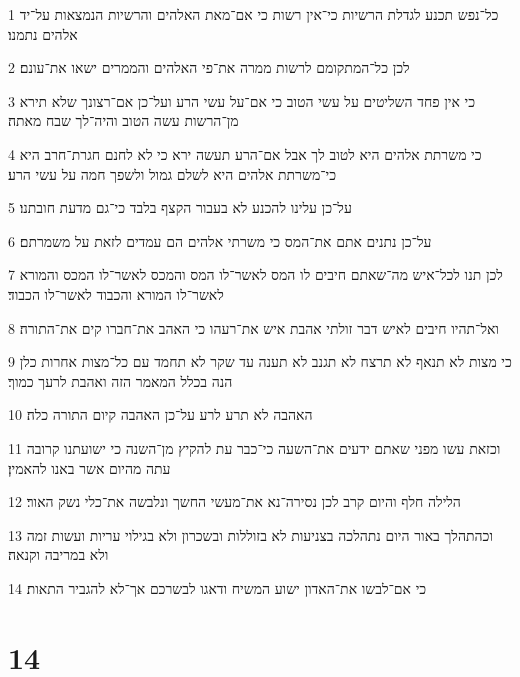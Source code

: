 \par 1 כל־נפש תכנע לגדלת הרשיות כי־אין רשות כי אם־מאת האלהים והרשיות הנמצאות על־יד אלהים נתמנו׃
\par 2 לכן כל־המתקומם לרשות ממרה את־פי האלהים והממרים ישאו את־עונם׃
\par 3 כי אין פחד השליטים על עשי הטוב כי אם־על עשי הרע ועל־כן אם־רצונך שלא תירא מן־הרשות עשה הטוב והיה־לך שבח מאתה׃
\par 4 כי משרתת אלהים היא לטוב לך אבל אם־הרע תעשה ירא כי לא לחנם חגרת־חרב היא כי־משרתת אלהים היא לשלם גמול ולשפך חמה על עשי הרע׃
\par 5 על־כן עלינו להכנע לא בעבור הקצף בלבד כי־גם מדעת חובתנו׃
\par 6 על־כן נתנים אתם את־המס כי משרתי אלהים הם עמדים לזאת על משמרתם׃
\par 7 לכן תנו לכל־איש מה־שאתם חיבים לו המס לאשר־לו המס והמכס לאשר־לו המכס והמורא לאשר־לו המורא והכבוד לאשר־לו הכבוד׃
\par 8 ואל־תהיו חיבים לאיש דבר זולתי אהבת איש את־רעהו כי האהב את־חברו קים את־התורה׃
\par 9 כי מצות לא תנאף לא תרצח לא תגנב לא תענה עד שקר לא תחמד עם כל־מצות אחרות כלן הנה בכלל המאמר הזה ואהבת לרעך כמוך׃
\par 10 האהבה לא תרע לרע על־כן האהבה קיום התורה כלה׃
\par 11 וכזאת עשו מפני שאתם ידעים את־השעה כי־כבר עת להקיץ מן־השנה כי ישועתנו קרובה עתה מהיום אשר באנו להאמין׃
\par 12 הלילה חלף והיום קרב לכן נסירה־נא את־מעשי החשך ונלבשה את־כלי נשק האור׃
\par 13 וכהתהלך באור היום נתהלכה בצניעות לא בזוללות ובשכרון ולא בגילוי עריות ועשות זמה ולא במריבה וקנאה׃
\par 14 כי אם־לבשו את־האדון ישוע המשיח ודאגו לבשרכם אך־לא להגביר התאות׃

\chapter{14}

